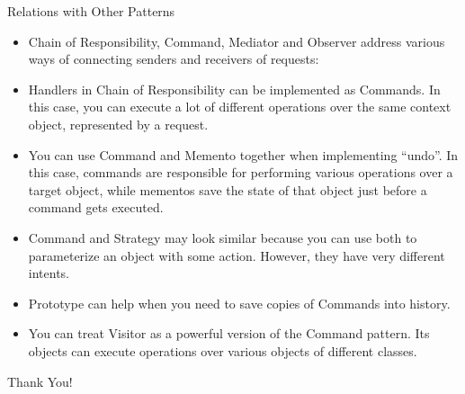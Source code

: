 \documentclass[13pt]{beamer}
\begin{document}
\begin{frame}{Relations with Other Patterns}
	\begin{itemize}
		\item Chain of Responsibility, Command, Mediator and Observer address various ways of connecting senders and receivers of requests:
		\item Handlers in Chain of Responsibility can be implemented as Commands. In this case, you can execute a lot of different operations over the same context object, represented by a request.
		\item You can use Command and Memento together when implementing “undo”. In this case, commands are responsible for performing various operations over a target object, while mementos save the state of that object just before a command gets executed.
		\item Command and Strategy may look similar because you can use both to parameterize an object with some action. However, they have very different intents.
		\item Prototype can help when you need to save copies of Commands into history.
		\item You can treat Visitor as a powerful version of the Command pattern. Its objects can execute operations over various objects of different classes.
	\end{itemize}
\end{frame}

\begin{frame}
\begin{center}
{\fontsize{40}{50}\selectfont Thank You!}
\end{center}
\end{frame}
\end{document}
